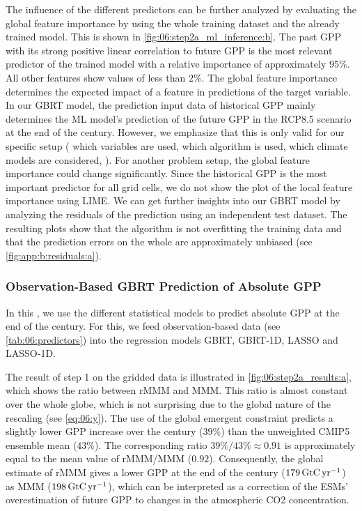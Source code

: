 The influence of the different predictors can be further analyzed by evaluating
the global feature importance by using the whole training dataset and the
already trained model. This is shown in \cref{fig:06:step2a_ml_inference:b}.
The past \ac{GPP} with its strong positive linear correlation to future
\ac{GPP} is the most relevant predictor of the trained model with a relative
importance of approximately $95 \unit{\%}$. All other features show values of
less than $2 \unit{\%}$. The global feature importance determines the expected
impact of a feature in predictions of the target variable. In our \ac{GBRT}
model, the prediction input data of historical \ac{GPP} mainly determines the
\ac{ML} model's prediction of the future \ac{GPP} in the \acs{RCP}8.5 scenario
at the end of the  century. However, we emphasize that this is only
valid for our specific setup (\ie{} which variables are used, which algorithm
is used, which climate models are considered, \etc{}). For another problem
setup, the global feature importance could change significantly. Since the
historical \ac{GPP} is the most important predictor for all grid cells, we do
not show the plot of the local feature importance using \ac{LIME}. We can get
further insights into our \ac{GBRT} model by analyzing the residuals of the
prediction using an independent test dataset. The resulting plots show that the
algorithm is not overfitting the training data and that the prediction errors
on the whole are approximately unbiased (see \cref{fig:app:b:residuals:a}).


\subsubsection{Observation-Based \acs{GBRT} Prediction of Absolute \acs{GPP}}
\label{subsubsec:06:results_step2a_obs}

In this , we use the different
statistical models to predict absolute \ac{GPP} at the end of the 
century. For this, we feed observation-based data (see
\cref{tab:06:predictors}) into the regression models \ac{GBRT}, \acs{GBRT}‐1D,
\ac{LASSO} and \acs{LASSO}‐1D.

The result of step 1 on the gridded data is illustrated in
\cref{fig:06:step2a_results:a}, which shows the ratio between r\acs{MMM} and
\ac{MMM}. This ratio is almost constant over the whole globe, which is not
surprising due to the global nature of the rescaling (see \cref{eq:06:y}). The
use of the global emergent constraint predicts a slightly lower \ac{GPP}
increase over the  century ($39 \unit{\%}$) than the unweighted
\acs{CMIP}5 ensemble mean ($43 \unit{\%}$). The corresponding ratio $39
\unit{\%} / 43 \unit{\%} \approx 0.91$ is approximately equal to the mean value
of r\acs{MMM}/\acs{MMM} ($0.92$). Consequently, the global estimate of
r\acs{MMM} gives a lower \ac{GPP} at the end of the century ($179
\unit{\GtCyr{}}$) as \ac{MMM} ($198 \unit{\GtCyr{}}$), which can be
interpreted as a correction of the \acp{ESM}' overestimation of future \ac{GPP}
to changes in the atmospheric \ac{CO2} concentration.

